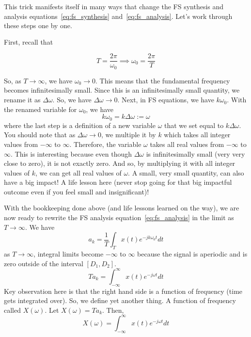 \documentclass{ee102_notes}
\begin{document}
This trick manifests itself in many ways that change the FS synthesis and analysis equations~\eqref{eq:fs_synthesis} and~\eqref{eq:fs_analysis}. Let's work through these steps one by one.

First, recall that 

\[  
T = \frac{2\pi}{\omega_0} \implies \omega_0 = \frac{2\pi}{T}
\]

So, as $T \to \infty$, we have $\omega_0 \to 0$. This means that the fundamental frequency becomes infinitesimally small. Since this is an infinitesimally small quantity, we rename it as $\Delta \omega$. So, we have $\Delta \omega \to 0$. Next, in FS equations, we have $k \omega_0$. With the renamed variable for $\omega_0$, we have
\[ 
k \omega_0 = k \Delta \omega := \omega
\]
where the last step is a definition of a new variable $\omega$ that we set equal to $k \Delta \omega$. You should note that as $\Delta \omega \to 0$, we multiple it by $k$ which takes all integer values from $-\infty$ to $\infty$. Therefore, the variable $\omega$ takes all real values from $-\infty$ to $\infty$. This is interesting because even though $\Delta \omega$ is infinitesimally small (very very close to zero), it is not exactly zero. And so, by multiplying it with all integer values of $k$, we can get all real values of $\omega$. A small, very small quantity, can also have a big impact! A life lesson here (never stop going for that big impactful outcome even if you feel small and insignificant)!

With the bookkeeping done above (and life lessons learned on the way), we are now ready to rewrite the FS analysis equation~\eqref{eq:fs_analysis} in the limit as $T \to \infty$. We have
\begin{equation*}
    a_k = \frac{1}{T} \int_{T} x(t) e^{-jk\omega_0 t} dt
\end{equation*}
as $T \to \infty$, integral limits become $-\infty$ to $\infty$ because the signal is aperiodic and is zero outside of the interval $[D_1, D_2]$.
\begin{equation*}
    T a_k = \int_{-\infty}^{\infty} x(t) e^{-j\omega t} dt
\end{equation*}
Key observation here is that the right hand side is a function of frequency (time gets integrated over). So, we define yet another thing. A function of frequency called $X(\omega)$. Let  $X(\omega) = T a_k$. Then,
\begin{equation}
  \label{eq:ft_analysis}
    X(\omega) = \int_{-\infty}^{\infty} x(t) e^{-j\omega t} dt
\end{equation}
\end{document}
